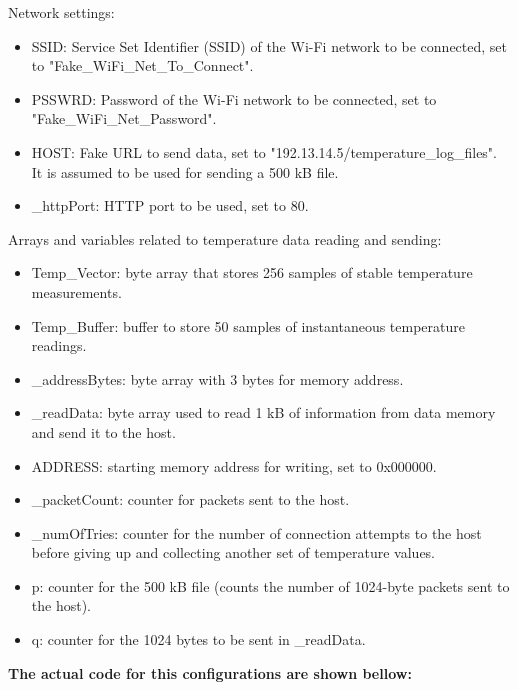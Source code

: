 Network settings:

\begin{itemize}
    \item SSID: Service Set Identifier (SSID) of the Wi-Fi network to be connected, set to "Fake\_WiFi\_Net\_To\_Connect".
    \item PSSWRD: Password of the Wi-Fi network to be connected, set to "Fake\_WiFi\_Net\_Password".
    \item HOST: Fake URL to send data, set to "192.13.14.5/temperature\_log\_files". It is assumed to be used for sending a 500 kB file.
    \item \_httpPort: HTTP port to be used, set to 80.
\end{itemize}

Arrays and variables related to temperature data reading and sending:

\begin{itemize}
    \item Temp\_Vector: byte array that stores 256 samples of stable temperature measurements.
    \item Temp\_Buffer: buffer to store 50 samples of instantaneous temperature readings.
    \item \_addressBytes: byte array with 3 bytes for memory address.
    \item \_readData: byte array used to read 1 kB of information from data memory and send it to the host.
    \item ADDRESS: starting memory address for writing, set to 0x000000.
    \item \_packetCount: counter for packets sent to the host.
    \item \_numOfTries: counter for the number of connection attempts to the host before giving up and collecting another set of temperature values.
    \item  p: counter for the 500 kB file (counts the number of 1024-byte packets sent to the host).
    \item q: counter for the 1024 bytes to be sent in \_readData.
\end{itemize}


\noindent \textbf{The actual code for this configurations are shown bellow:}

